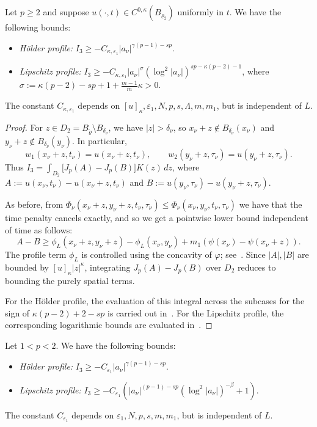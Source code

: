 \documentclass[11pt, a4paper, twoside]{article}
\theoremstyle{definition}
\theoremstyle{remark}
\begin{document}
\begin{lemma}
\label{lem:parabolic-I3-super}
Let $p \ge 2$ and suppose $u(\cdot,t) \in C^{0,\kappa}(B_{\varrho_2})$ uniformly in $t$. We have the following bounds:
\begin{itemize}
  \item \emph{H\"{o}lder profile:} $I_3 \ge -C_{\kappa,\varepsilon_1} |a_\nu|^{\gamma(p-1)-sp}$.
  \item \emph{Lipschitz profile:} $I_3 \ge -C_{\kappa,\varepsilon_1}|a_\nu|^\sigma (\log^2|a_\nu|)^{sp-\kappa(p-2)-1}$, where $\sigma := \kappa(p-2)-sp+1+\tfrac{m-1}{m}\kappa > 0$.
\end{itemize}
The constant $C_{\kappa,\varepsilon_1}$ depends on $[u]_\kappa, \varepsilon_1, N, p, s, \Lambda, m, m_1$, but is independent of $L$.
\end{lemma}

\begin{proof}
For $z \in D_2 = B_{\tilde\varrho} \setminus B_{\delta_\nu}$, we have $|z| > \delta_\nu$, so $x_\nu + z \notin B_{\delta_\nu}(x_\nu)$ and $y_\nu + z \notin B_{\delta_\nu}(y_\nu)$. In particular, 
\[
  w_1(x_\nu+z,t_\nu) = u(x_\nu+z,t_\nu), \qquad w_2(y_\nu+z,\tau_\nu) = u(y_\nu+z,\tau_\nu).
\]
Thus $I_3 = \int_{D_2} \bigl[J_p(A) - J_p(B)\bigr]K(z)\,dz$, where $A := u(x_\nu,t_\nu) - u(x_\nu+z,t_\nu)$ and $B := u(y_\nu,\tau_\nu) - u(y_\nu+z,\tau_\nu)$.

As before, from $\Phi_\nu(x_\nu+z, y_\nu+z, t_\nu, \tau_\nu) \le \Phi_\nu(x_\nu, y_\nu, t_\nu, \tau_\nu)$ we have that the time penalty cancels exactly, and so we get a pointwise lower bound independent of time as follows:
\[
  A - B \ge \phi_L(x_\nu+z, y_\nu+z) - \phi_L(x_\nu, y_\nu) + m_1(\psi(x_\nu) - \psi(x_\nu+z)).
\]
The profile term $\phi_L$ is controlled using the concavity of $\varphi$; see~\cite[Lemma~3.3]{BiswasTopp2025}. Since $|A|, |B|$ are bounded by $[u]_\kappa |z|^\kappa$, integrating $J_p(A) - J_p(B)$ over $D_2$ reduces to bounding the purely spatial terms. 

For the H\"{o}lder profile, the evaluation of this integral across the subcases for the sign of $\kappa(p-2)+2-sp$ is carried out in~\cite[Proposition~3.5]{BiswasTopp2025}. For the Lipschitz profile, the corresponding logarithmic bounds are evaluated in~\cite[Proof of Theorem~2.1]{BiswasTopp2025}.
\end{proof}

\begin{lemma}
\label{lem:parabolic-I3-sub}
Let $1<p<2$. We have the following bounds:
\begin{itemize}
  \item \emph{H\"{o}lder profile:} $I_3 \ge -C_{\varepsilon_1} |a_\nu|^{\gamma(p-1)-sp}$.
  \item \emph{Lipschitz profile:} $I_3 \ge -C_{\varepsilon_1} (|a_\nu|^{(p-1)-sp} (\log^{2}|a_\nu|)^{-\beta}+1)$.
\end{itemize}
The constant $C_{\varepsilon_1}$ depends on $\varepsilon_1, N, p, s, m, m_1$, but is independent of $L$.
\end{lemma}
\end{document}
